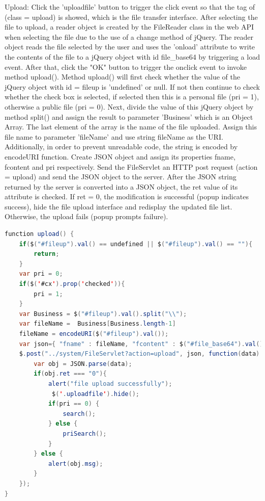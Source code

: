 \documentclass[a4paper,11pt]{article}
\begin{document}
\begin{itemize}
\par Upload: Click the 'uploadfile' button to trigger the click event so that the tag of (class = upload) is showed, which is the file transfer interface. After selecting the file to upload, a reader object is created by the FileReader class in the web API when selecting the file due to the use of a change method of jQuery. The reader object reads the file selected by the user and uses the 'onload' attribute to write the contents of the file to a jQuery object with id file\_base64 by triggering a load event. After that, click the "OK" button to trigger the onclick event to invoke method upload(). Method upload() will first check whether the value of the jQuery object with id = fileup is 'undefined' or null. If not then continue to check whether the check box is selected, if selected then this is a personal file (pri = 1), otherwise a public file (pri = 0). Next, divide the value of this jQuery object by method split() and assign the result to parameter 'Business' which is an Object Array. The last element of the array is the name of the file uploaded. Assign this file name to parameter 'fileName' and use string fileName as the URI. Additionally, in order to prevent unreadable code, the string is encoded by encodeURI function. Create JSON object and assign its properties fname, fcontent and pri respectively.
Send the FileServlet an HTTP post request (action = upload) and send the JSON object to the server. After the JSON string returned by the server is converted into a JSON object, the ret value of its attribute is checked. If ret = 0, the modification is successful (popup indicates success), hide the file upload interface and redisplay the updated file list. Otherwise, the upload fails (popup prompts failure).

\begin{lstlisting}[language=Java]
function upload() {
	if($("#fileup").val() == undefined || $("#fileup").val() == ""){
		return;
	}
	var pri = 0;
	if($('#cx').prop('checked')){
		pri = 1;
	}
	var Business = $("#fileup").val().split("\\");
	var fileName =  Business[Business.length-1]
	fileName = encodeURI($("#fileup").val());
	var json={ "fname" : fileName, "fcontent" : $("#file_base64").val(), "pri" : pri};
	$.post("../system/FileServlet?action=upload", json, function(data) {
		var obj = JSON.parse(data);
		if(obj.ret === "0"){
			alert("file upload successfully");
			 $('.uploadfile').hide();
			if(pri == 0) {
				search();
			} else {
				priSearch();
			}
		} else {
			alert(obj.msg);
		}
	});
}
\end{lstlisting}


\end{itemize}
\end{document}
